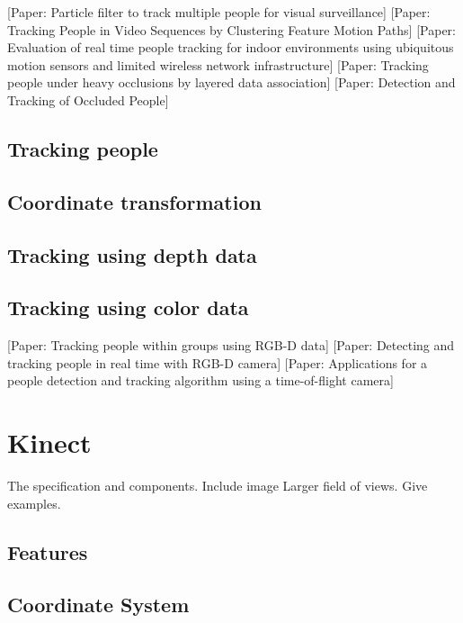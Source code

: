 \documentclass{sigchi}
\begin{document}
[Paper: Particle filter to track multiple people for visual surveillance]
[Paper: Tracking People in Video Sequences by Clustering Feature Motion Paths]
[Paper: Evaluation of real time people tracking for indoor environments using ubiquitous motion sensors and limited wireless network infrastructure]
[Paper: Tracking people under heavy occlusions by layered data association]
[Paper: Detection and Tracking of Occluded People]

\subsection{Tracking people}

\subsection{Coordinate transformation}

\cite{wei_kinect_calibration}
\cite{eggert_four_algorithms}
\cite{horn_unit_quaternions}

\subsection{Tracking using depth data}

\subsection{Tracking using color data}

[Paper: Tracking people within groups using RGB-D data]
[Paper: Detecting and tracking people in real time with RGB-D camera]
[Paper: Applications for a people detection and tracking algorithm using a time-of-flight camera]

\section{Kinect}
\label{sec:kinect}

The specification and components. Include image Larger field of views. Give examples.

\subsection{Features}

\subsection{Coordinate System}
\end{document}
